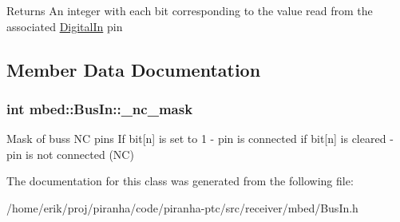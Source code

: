 \begin{DoxyReturn}{Returns}
An integer with each bit corresponding to the value read from the associated \hyperlink{classmbed_1_1DigitalIn}{Digital\+In} pin 
\end{DoxyReturn}


\subsection{Member Data Documentation}
\subsubsection[{\texorpdfstring{\+\_\+nc\+\_\+mask}{_nc_mask}}]{\setlength{\rightskip}{0pt plus 5cm}int mbed\+::\+Bus\+In\+::\+\_\+nc\+\_\+mask\hspace{0.3cm}{\ttfamily [protected]}}\hypertarget{classmbed_1_1BusIn_a3ccecbfabfbc7bcf74034264be551c3e}{}\label{classmbed_1_1BusIn_a3ccecbfabfbc7bcf74034264be551c3e}
Mask of bus\textquotesingle{}s NC pins If bit\mbox{[}n\mbox{]} is set to 1 -\/ pin is connected if bit\mbox{[}n\mbox{]} is cleared -\/ pin is not connected (NC) 

The documentation for this class was generated from the following file\+:\begin{DoxyCompactItemize}
\item 
/home/erik/proj/piranha/code/piranha-\/ptc/src/receiver/mbed/Bus\+In.\+h\end{DoxyCompactItemize}
